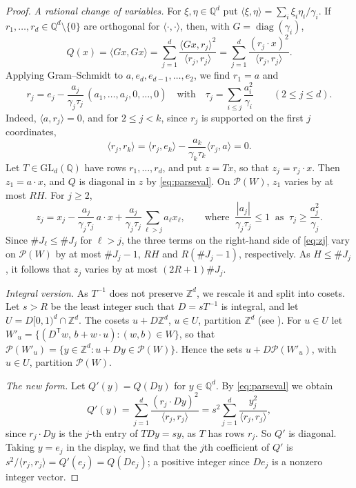 \documentclass[a4paper,reqno,12pt]{amsart}
\theoremstyle{plain}
\theoremstyle{plain}
\theoremstyle{remark}
\theoremstyle{plain}
\newcommand{\cP}{\mathscr{P}}
\newcommand{\z}{\mathbb{Z}}
\theoremstyle{plain}
\theoremstyle{plain}
\begin{document}
{\begin{proof}
\emph{A rational change of variables.} For $\xi,\eta\in\mathbb Q^d$ put
$\langle\xi,\eta\rangle=\sum_i\xi_i\eta_i/\gamma_i$. If $r_1,{\ldots},r_d\in\mathbb Q^d\setminus\{0\}$ are
orthogonal for $\langle\cdot,\cdot\rangle$, then, with $G=\operatorname{diag}(\gamma_i)$,
\begin{equation}\label{eq:parseval}
 Q(x)=\langle Gx,Gx\rangle=\sum_{j=1}^d\frac{\langle Gx,r_j\rangle^2}{\langle r_j,r_j\rangle}
 =\sum_{j=1}^d\frac{(r_j\cdot x)^2}{\langle r_j,r_j\rangle}.
\end{equation}
Applying Gram--Schmidt to $a,e_d,e_{d-1},{\ldots},e_2$, we find $r_1=a$ and
\[
 r_j=e_j-\frac{a_j}{\gamma_j\tau_j}\,(a_1,{\ldots},a_j,0,{\ldots},0) \quad \text{with} \quad
 \tau_j=\sum_{i\le j}\frac{a_i^2}{\gamma_i}\qquad(2\le j\le d).
\]
Indeed, $\langle a,r_j\rangle=0$, and for $2\le j<k$, since $r_j$ is supported on the first $j$
coordinates,
\[
 \langle r_j,r_k\rangle=\langle r_j,e_k\rangle-\frac{a_k}{\gamma_k\tau_k}\langle r_j,a\rangle=0.
\]
Let $T\in\mathrm{GL}_d(\mathbb Q)$ have rows $r_1,{\ldots},r_d$, and put $z=Tx$, so that $z_j=r_j\cdot x$.
Then $z_1=a\cdot x$, and $Q$ is diagonal in $z$ by \eqref{eq:parseval}. On $\cP(W)$, $z_1$ varies by at most $RH$. For $j\ge2$,
\begin{equation}\label{eq:zj}
 z_j=x_j-\frac{a_j}{\gamma_j\tau_j}\,a\cdot x+\frac{a_j}{\gamma_j\tau_j}\sum_{\ell>j}a_\ell x_\ell,
 \qquad\text{where }\ \frac{|a_j|}{\gamma_j\tau_j}\le1\ \text{ as }\ \tau_j\ge\frac{a_j^2}{\gamma_j}.
\end{equation}
Since $\#J_\ell\le\#J_j$ for $\ell>j$, the three terms on the right-hand side of \eqref{eq:zj} vary on
$\cP(W)$ by at most $\#J_j-1$, $RH$ and $R(\#J_j-1)$, respectively. As $H\le\#J_j$, it follows that
$z_j$ varies by at most $(2R+1)\#J_j$.

\emph{Integral version.} As $T^{-1}$ does not preserve $\z^d$, we rescale it and split into cosets.
Let $s>R$ be the least integer such that $D=sT^{-1}$ is integral, and let $U=D[0,1)^d\cap\z^d$. The
cosets $u+D\z^d$, $u\in U$, partition $\z^d$ (see  \cite[Proposition~1.3.10 and Corollary~1.3.27]{HNP}). For
$u\in U$ let $W'_u=\{(D^{\mathsf T}w,\,b+w\cdot u):(w,b)\in W\}$, so that
$\cP(W'_u)=\{y\in\z^d:u+Dy\in\cP(W)\}$. Hence the sets $u+D\cP(W'_u)$, with $u\in U$, partition $\cP(W)$.

\emph{The new form.} Let $Q'(y)=Q(Dy)$ for $y\in\mathbb Q^d$. By \eqref{eq:parseval} we obtain
\[
 Q'(y)=\sum_{j=1}^d\frac{(r_j\cdot Dy)^2}{\langle r_j,r_j\rangle}
 =s^2\sum_{j=1}^d\frac{y_j^2}{\langle r_j,r_j\rangle},
\]
since $r_j\cdot Dy$ is the $j$-th entry of $TDy=sy$, as $T$ has rows $r_j$. So $Q'$ is diagonal. Taking $y=e_j$ in the display, we find that the \(j\)th coefficient of \(Q'\) is $s^2/\langle r_j,r_j\rangle=Q'(e_j)=Q(De_j)$; a positive integer since $De_j$ is a nonzero integer
vector.


\end{proof}}
\end{document}
